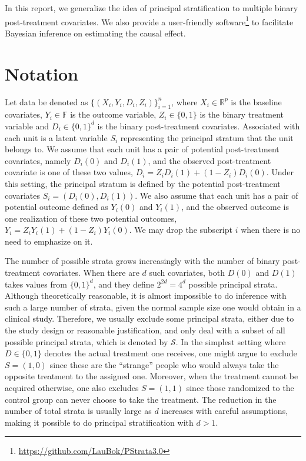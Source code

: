\documentclass{article}
\begin{document}
In this report, we generalize the idea of principal stratification to multiple binary post-treatment covariates. We also provide a user-friendly software\footnote{\url{https://github.com/LauBok/PStrata3.0}} to facilitate Bayesian inference on estimating the causal effect.

\section{Notation}

Let data be denoted as $\{(X_i, Y_i, D_i, Z_i)\}_{i=1}^n$, where $X_i\in \mathbb{R}^p$ is the baseline covariates, $Y_i \in \mathbb{F}$ is the outcome variable, $Z_i \in \{0, 1\}$ is the binary treatment variable and $D_i \in \{0, 1\}^d$ is the binary post-treatment covariates. Associated with each unit is a latent variable $S_i$ representing the principal stratum that the unit belongs to. We assume that each unit has a pair of potential post-treatment covariates, namely $D_i(0)$ and $D_i(1)$, and the observed post-treatment covariate is one of these two values, $D_i = Z_i D_i(1) + (1 - Z_i) D_i(0)$. Under this setting, the principal stratum is defined by the potential post-treatment covariates $S_i = (D_i(0), D_i(1))$. We also assume that each unit has a pair of potential outcome defined as $Y_i(0)$ and $Y_i(1)$, and the observed outcome is one realization of these two potential outcomes, $Y_i = Z_i Y_i(1) + (1 - Z_i)Y_i(0)$. We may drop the subscript $i$ when there is no need to emphasize on it.

The number of possible strata grows increasingly with the number of binary post-treatment covariates. When there are $d$ such covariates, both $D(0)$ and $D(1)$ takes values from $\{0, 1\}^{d}$, and they define $2^{2d} = 4^d$ possible principal strata. Although theoretically reasonable, it is almost impossible to do inference with such a large number of strata, given the normal sample size one would obtain in a clinical study. Therefore, we usually exclude some principal strata, either due to the study design or reasonable justification, and only deal with a subset of all possible principal strata, which is denoted by $\mathcal{S}$. In the simplest setting where $D\in \{0, 1\}$ denotes the actual treatment one receives, one might argue to exclude $S = (1, 0)$ since these are the ``strange'' people who would always take the opposite treatment to the assigned one. Moreover, when the treatment cannot be acquired otherwise, one also excludes $S = (1, 1)$ since those randomized to the control group can never choose to take the treatment. The reduction in the number of total strata is usually large as $d$ increases with careful assumptions, making it possible to do principal stratification with $d > 1$.
\end{document}

